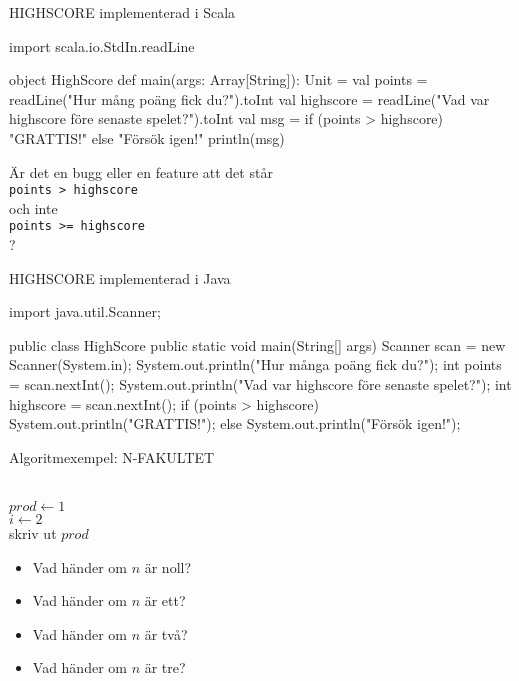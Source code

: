 \begin{Slide}{HIGHSCORE implementerad i Scala}
\begin{Code}
import scala.io.StdIn.readLine

object HighScore {
  def main(args: Array[String]): Unit = {
    val points = readLine("Hur mång poäng fick du?").toInt
    val highscore = readLine("Vad var highscore före senaste spelet?").toInt
    val msg = if (points > highscore) "GRATTIS!" else "Försök igen!"
    println(msg)
  }
}
\end{Code}
\pause
Är det en bugg eller en feature att det står\\ \texttt{points > highscore} \\ och inte \\ \texttt{points >= highscore} \\ ?
\end{Slide}


\begin{Slide}{HIGHSCORE implementerad i Java}
\begin{Code}[language=Java]
import java.util.Scanner;

public class HighScore {
    public static void main(String[] args){
        Scanner scan = new Scanner(System.in);
        System.out.println("Hur många poäng fick du?");
        int points =  scan.nextInt();
        System.out.println("Vad var highscore före senaste spelet?");
        int highscore = scan.nextInt();
        if (points > highscore) {
            System.out.println("GRATTIS!");
        } else {
            System.out.println("Försök igen!");
        }
    }
}
\end{Code}
\end{Slide}


\begin{Slide}{Algoritmexempel: N-FAKULTET}
\begin{algorithm}[H]

 ~\\
 $prod \leftarrow 1$ \\
 $i \leftarrow 2$  \\
 skriv ut $prod$
\end{algorithm}
\pause\vspace{1em}
\begin{itemize}\SlideFontSmall
\item Vad händer om $n$ är noll?
\item Vad händer om $n$ är ett?
\item Vad händer om $n$ är två?
\item Vad händer om $n$ är tre?
\end{itemize}
\end{Slide}

